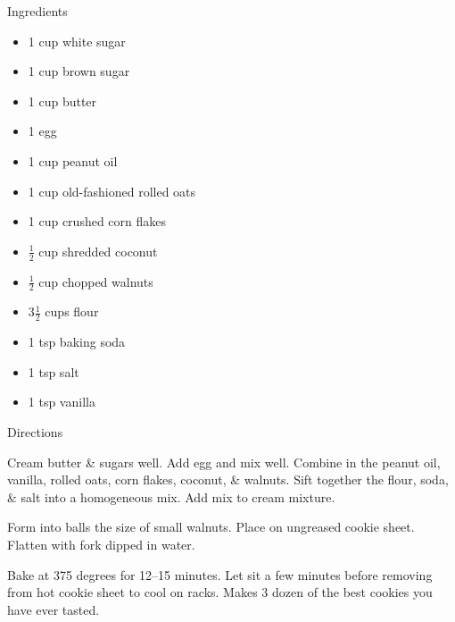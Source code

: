 Ingredients
	\begin{itemize}
		\item 1 cup white sugar
		\item 1 cup brown sugar
		\item 1 cup butter
		\item 1 egg
		\item 1 cup peanut oil
		\item 1 cup old-fashioned rolled oats
		\item 1 cup crushed corn flakes
		\item $\frac{1}{2}$ cup shredded coconut
		\item $\frac{1}{2}$ cup chopped walnuts
		\item $3\frac{1}{2}$ cups flour
		\item 1 tsp baking soda
		\item 1 tsp salt
		\item 1 tsp vanilla
	\end{itemize}
	
	\noindent
	Directions
	\newline
	
	Cream butter \& sugars well. Add egg and mix well. Combine in the peanut oil, vanilla, rolled oats, corn flakes, coconut, \& walnuts. Sift together the flour, soda, \& salt into a homogeneous mix. Add mix to cream mixture.
	
	Form into balls the size of small walnuts. Place on ungreased cookie sheet. Flatten with fork dipped in water.
	
	Bake at 375 degrees for 12--15 minutes. Let sit a few minutes before removing from hot cookie sheet to cool on racks. Makes 3 dozen of the best cookies you have ever tasted.
